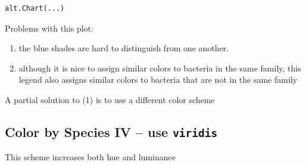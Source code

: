 \documentclass[
  letterpaper,
  DIV=11,
  numbers=noendperiod]{scrartcl}
\providecommand{\tightlist}{%
  \setlength{\itemsep}{0pt}\setlength{\parskip}{0pt}}\usepackage{longtable,booktabs,array}
\begin{document}
\begin{verbatim}
alt.Chart(...)
\end{verbatim}

Problems with this plot:

\begin{enumerate}
\def\labelenumi{\arabic{enumi}.}
\tightlist
\item
  the blue shades are hard to distinguish from one another.
\item
  although it is nice to assign similar colors to bacteria in the same
  family, this legend also assigns similar colors to bacteria that are
  not in the same family
\end{enumerate}

A partial solution to (1) is to use a different color scheme

\subsection{\texorpdfstring{Color by Species IV -- use
\texttt{viridis}}{Color by Species IV -- use viridis}}\label{color-by-species-iv-use-viridis}

This scheme increases both hue and luminance
\end{document}
